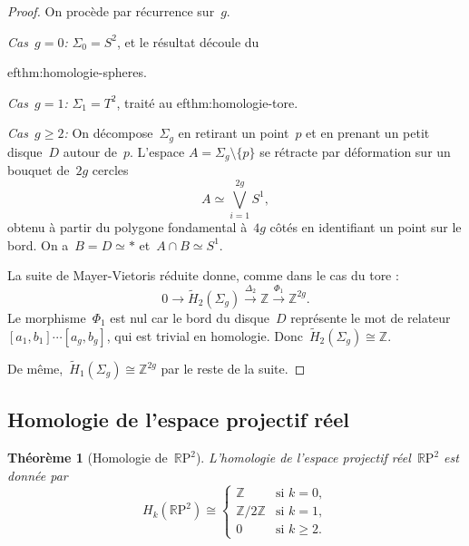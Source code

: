 \documentclass[12pt,a4paper,openany]{book}
\theoremstyle{definition}
\theoremstyle{plain}
\newtheorem{theoreme}[definition]{Théorème}
\theoremstyle{remark}
\newcommand{\Z}{\mathbb{Z}}
\newcommand{\RP}{\mathbb{R}\mathrm{P}}
\begin{document}
\begin{proof}
On procède par récurrence sur~$g$.

\noindent\textit{Cas~$g = 0$:} $\Sigma_0 = S^2$, et le résultat découle du

ef{thm:homologie-spheres}.

\noindent\textit{Cas~$g = 1$:} $\Sigma_1 = T^2$, traité au 
ef{thm:homologie-tore}.

\noindent\textit{Cas~$g \geqslant 2$:} On décompose~$\Sigma_g$ en retirant un
point~$p$ et en prenant un petit disque~$D$ autour de~$p$. L'espace
$A = \Sigma_g \setminus \{p\}$ se rétracte par déformation sur un bouquet de~$2g$
cercles
\[
  A \simeq \bigvee_{i=1}^{2g} S^1,
\]
obtenu à partir du polygone fondamental à~$4g$ côtés
en identifiant un point sur le bord. On a~$B = D \simeq \ast$ et~$A \cap B \simeq S^1$.

La suite de Mayer-Vietoris réduite donne, comme dans le cas du tore :
\[
  0 \to \widetilde{H}_2(\Sigma_g) \xrightarrow{\Delta_2} \Z
  \xrightarrow{\Phi_1} \Z^{2g}.
\]
Le morphisme~$\Phi_1$ est nul car le bord du disque~$D$ représente le
mot de relateur~$[a_1, b_1] \cdots [a_g, b_g]$, qui est trivial en homologie.
Donc~$\widetilde{H}_2(\Sigma_g) \cong \Z$.

De même,~$\widetilde{H}_1(\Sigma_g) \cong \Z^{2g}$ par le reste de la suite.
\end{proof}

\subsection{Homologie de l'espace projectif réel}\label{subsec:homologie-rpn}
\index{$\RP^n$!homologie}

\begin{theoreme}[Homologie de~$\RP^2$]\label{thm:homologie-rp2}
L'homologie de l'espace projectif réel~$\RP^2$ est donnée par
\[
  H_k(\RP^2) \cong
  \begin{cases}
    \Z      & \text{si } k = 0,\\
    \Z/2\Z  & \text{si } k = 1,\\
    0       & \text{si } k \geqslant 2.
  \end{cases}
\]
\end{theoreme}
\end{document}
